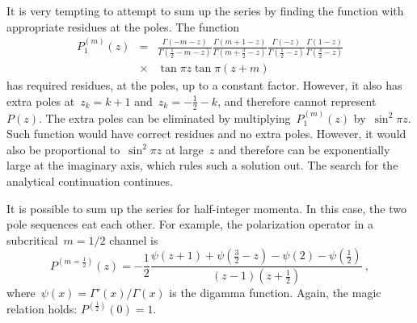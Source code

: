\documentclass[preprint,aps,prb]{revtex4}
\begin{document}
It is very tempting to attempt to sum up the series by finding the
function with appropriate residues at the poles. The function
\begin{eqnarray}
P^{(m)}_{1}(z) &=&  
\frac{\Gamma\left(-m - z\right)}{\Gamma\left(\frac{1}{2}  - m - z\right)} 
\frac{\Gamma\left(m + 1 - z \right)}{ \Gamma\left(m + \frac{3}{2} - z\right)}
\frac{\Gamma\left(-z\right)}{\Gamma\left(\frac{1}{2} - z\right)}
\frac{\Gamma\left(1 - z\right)}{\Gamma\left(\frac{3}{2} - z\right)} 
\nonumber
\\
&\times& \tan \pi z \tan \pi (z + m)
\end{eqnarray}
has required residues, at the poles, up to a constant factor. 
However, it also has extra poles
at~$z_k = k + 1$ and~$z_k = -\frac{1}{2} - k$, and therefore cannot
represent~$P(z)$. The extra poles can be eliminated by
multiplying~$P^{(m)}_1(z)$ by~$\sin^2 \pi z$. Such function would 
have correct residues and no extra poles. However, it would also be 
proportional to~$\sin^2 \pi z$ at large~$z$ and therefore can be
exponentially large at the imaginary axis, which rules such a solution
out. The search for the analytical continuation continues. 

It is possible to sum up the series for half-integer momenta. 
In this case, the two pole sequences eat each other. For example, the 
polarization operator in a subcritical~$m = 1/2$ channel is 
\begin{equation}
P^{(m = \frac{1}{2})}(z) 
= - \frac{1}{2}
  \frac{\psi(z + 1) + \psi\left(\frac{3}{2} - z\right) - \psi(2) 
        - \psi\left(\frac{1}{2}\right)}{\left(z - 1 \right)\left(z +
	\frac{1}{2}\right)}
\ , 
\end{equation}
where~$\psi(x) = \Gamma'(x) / \Gamma(x)$ is the digamma function. 
Again, the magic relation holds: $P^{(\frac{1}{2})}(0) = 1$.
\end{document}
